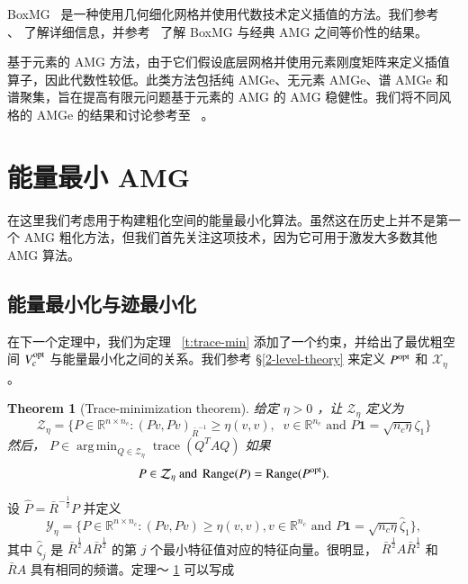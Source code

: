 \documentclass[12pt]{acta_2011xz}
\newtheorem{theorem}{Theorem}[section]
\DeclareMathOperator*{\argmin}{arg\,min}
\DeclareMathOperator*{\range}{Range}
\begin{document}
BoxMG~    \cite{1982DendyJ-ab,1983DendyJ-aa}    是一种使用几何细化网格并使用代数技术定义插值的方法。我们参考~    \cite{1982DendyJ-ab,1983DendyJ-aa}    、
   \cite{1990ZeeuwP-aa}    了解详细信息，并参考~    \cite{2012MacLachlanS_MoultonJ_ChartierT-aa}    了解 BoxMG 与经典 AMG 之间等价性的结果。  

基于元素的 AMG 方法，由于它们假设底层网格并使用元素刚度矩阵来定义插值算子，因此代数性较低。此类方法包括纯 AMGe、无元素 AMGe、谱 AMGe 和谱聚集，旨在提高有限元问题基于元素的 AMG 的 AMG 稳健性。我们将不同风格的 AMGe 的结果和讨论参考至~    \cite{Jones.J;Vassilevski.P.2001a,Brezina.M;Cleary.A;Falgout.R;Henson.V;Jones.J;Manteuffel.T;McCormick.S;Ruge.J.2001a,Henson.V;Vassilevski.P.2001a,Brezina.M;Falgout.R;MacLachlan.S;Manteuffel.T;McCormick.S;Ruge.J.2006b}    。  

   \section{能量最小 AMG  }       \label{sec:energy-min}    在这里我们考虑用于构建粗化空间的能量最小化算法。虽然这在历史上并不是第一个 AMG 粗化方法，但我们首先关注这项技术，因为它可用于激发大多数其他 AMG 算法。  

   \subsection{能量最小化与迹最小化  }       \label{s:energy-trace}    在下一个定理中，我们为定理~   \ref{t:trace-min}    添加了一个约束，并给出了最优粗空间    $V_c^{\rm opt}$    与能量最小化之间的关系。我们参考    \S       \ref{2-level-theory}    来定义    $P^{\rm opt}$    和    $\mathcal X_{\eta}$    。
   \begin{theorem}[Trace-minimization theorem]   \label{thm:trace-min}    给定    $\eta>0$    ，让    $\mathcal Z_{\eta}$    定义为 
   \begin{equation}
    \label{Z1}
\mathcal Z_\eta=
\bigg \{ 
  P\in\mathbb R^{n\times n_c}:  (Pv,Pv)_{\bar R^{-1}}\ge \eta (v,v),\;\;
  v\in \mathbb R^{n_c}\mbox{ and } P\bm 1=\sqrt{n_c\eta}\zeta_1\bigg \} 
\end{equation}    然后，   $P\in \argmin_{Q\in \mathcal{Z}_\eta}\operatorname{trace}(Q^TAQ)$    如果 
   $$
    P\in \mathcal Z_{\eta} \text{ and } \range(P)=\range(P^{\rm opt}).
$$     \end{theorem}     

设    $\hat P= \bar R^{-\frac{1}{2}}P$    并定义 
   \begin{equation}\label{yeta}
    \mathcal Y_{\eta}=\bigg \{ P\in \mathbb{R}^{n\times n_c}: (Pv, Pv)\ge \eta(v, v), v\in \mathbb{R}^{n_c} \text{ and } P\bm 1=\sqrt{n_c\eta}\hat \zeta_1 \bigg \} ,
\end{equation}    其中    $\hat \zeta_j$    是    $\bar R^{\frac{1}{2}}A\bar R^{\frac{1}{2}}$    的第    $j$    个最小特征值对应的特征向量。很明显，   $\bar R^{\frac{1}{2}}A\bar R^{\frac{1}{2}}$    和    $\bar RA$    具有相同的频谱。定理〜   \ref{thm:trace-min}    可以写成  
\end{document}
